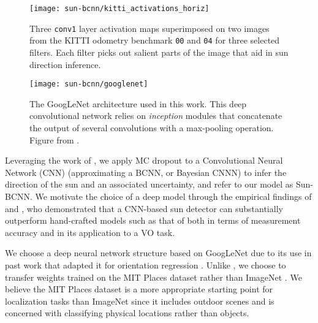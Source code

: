 \begin{figure}
    \centering
    \texttt{[image: sun-bcnn/kitti\_activations\_horiz]}
    \caption{Three \texttt{conv1} layer activation maps superimposed on two images from the KITTI odometry benchmark \citep{Geiger2013-ky} \texttt{00} and \texttt{04} for three selected filters. Each filter picks out salient parts of the image that aid in sun direction inference.}
    \label{fig:sun-bcnn_kitti_cnn_activations}
\end{figure}

\begin{figure}
    \centering
    \texttt{[image: sun-bcnn/googlenet]}
    \caption{The GoogLeNet architecture used in this work. This deep convolutional network relies on \textit{inception} modules that concatenate the output of several convolutions with a max-pooling operation. Figure from \cite{Szegedy2015-uw}.}
    \label{fig:sun-bcnn_kitti_cnn_activations}
\end{figure}


Leveraging the work of \cite{Gal2016CNN}, we apply MC dropout to a Convolutional Neural Network (CNN) (approximating a BCNN, or Bayesian CNNN) to infer the direction of the sun and an associated uncertainty, and refer to our model as Sun-BCNN. 
We motivate the choice of a deep model through the empirical findings of \citet{2017_Clement_Improving} and \citet{Ma2016-at}, who demonstrated that a CNN-based sun detector can substantially outperform hand-crafted models such as that of \citet{Lalonde2011-jw} both in terms of measurement accuracy and in its application to a VO task.

We choose a deep neural network structure based on GoogLeNet \citep{Szegedy2015-uw} due to its use in past work that adapted it for orientation regression \citep{Kendall2016-zf,Kendall2015-ew}. 
Unlike \citet{Ma2016-at}, we choose to transfer weights trained on the MIT Places dataset \citep{zhou2014MITPlaces} rather than ImageNet \citep{deng2009imagenet}.
We believe the MIT Places dataset is a more appropriate starting point for localization tasks than ImageNet since it includes outdoor scenes and is concerned with classifying physical locations rather than objects.

